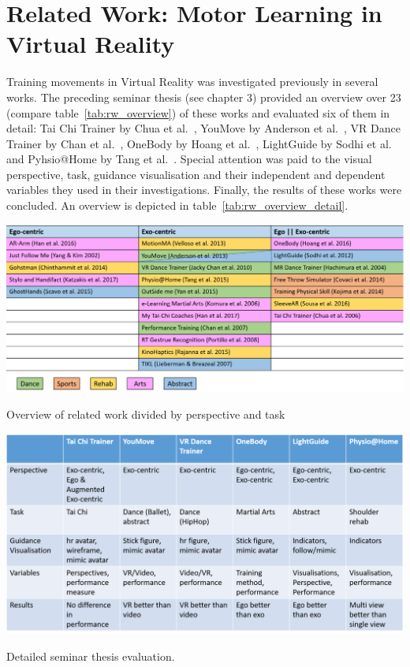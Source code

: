 \section{Related Work: Motor Learning in Virtual Reality}
\label{section:related_work}
Training movements in Virtual Reality was investigated previously in several works. The preceding seminar thesis (see chapter 3) provided an overview over 23 (compare table~\ref{tab:rw_overview}) of these works and evaluated six of them in detail: Tai Chi Trainer by Chua et al.~\cite{thaichichua}, YouMove by Anderson et al.~\cite{YouMove}, VR Dance Trainer by Chan et al.~\cite{vrdancetrainer}, OneBody by Hoang et al.~\cite{onebody}, LightGuide by Sodhi et al.~\cite{lightguide} and Pyhsio@Home by Tang et al.~\cite{physioathome}. Special attention was paid to the visual perspective, task, guidance visualisation and their independent and dependent variables they used in their investigations. Finally, the results of these works were concluded. An overview is depicted in table~\ref{tab:rw_overview_detail}.
\begin{table}[htb]
	\centering
	\includegraphics[width=\textwidth]{figures/rw_overview.png}
	\caption[Overview seminar evaluation]{Overview of related work divided by perspective and task}
	\label{tab:rw_overview}
\end{table}
\begin{table}[htb]
	\centering
	\includegraphics[width=\textwidth]{figures/detail_paper_overview.png}
	\caption[Detailed analysis of related work in seminar thesis.]{Detailed seminar thesis evaluation.}
	\label{tab:rw_overview_detail}
\end{table}
